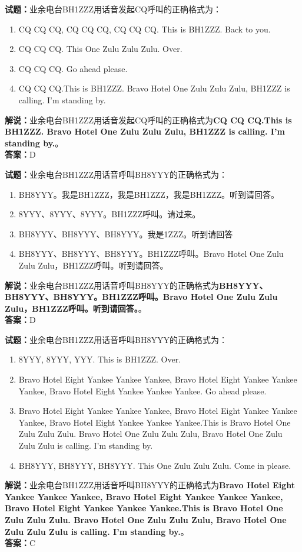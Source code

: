 \documentclass{ctexbook}
\begin{document}
\vspace{1em}

\textbf{试题：}业余电台BH1ZZZ用话音发起CQ呼叫的正确格式为：
\begin{enumerate}[leftmargin=3em]
  \item CQ CQ CQ, CQ CQ CQ, CQ CQ CQ. This is BH1ZZZ. Back to you.
  \item CQ CQ CQ. This One Zulu Zulu Zulu. Over.
  \item CQ CQ CQ. Go ahead please.
  \item CQ CQ CQ.This is BH1ZZZ. Bravo Hotel One Zulu Zulu Zulu, BH1ZZZ is calling. I’m standing by.
\end{enumerate}
\noindent\textbf{解说：}业余电台BH1ZZZ用话音发起CQ呼叫的正确格式为\textbf{CQ CQ CQ.This is BH1ZZZ. Bravo Hotel One Zulu Zulu Zulu, BH1ZZZ is calling. I’m standing by.}。\\\noindent\textbf{答案：}D

\vspace{1em}

\textbf{试题：}业余电台BH1ZZZ用话音呼叫BH8YYY的正确格式为：
\begin{enumerate}[leftmargin=3em]
  \item BH8YYY。我是BH1ZZZ，我是BH1ZZZ，我是BH1ZZZ。听到请回答。
  \item 8YYY、8YYY、8YYY。BH1ZZZ呼叫。请过来。
  \item BH8YYY、BH8YYY、BH8YYY。我是1ZZZ。听到请回答
  \item BH8YYY、BH8YYY、BH8YYY。BH1ZZZ呼叫。Bravo Hotel One Zulu Zulu Zulu，BH1ZZZ呼叫。听到请回答。
\end{enumerate}
\noindent\textbf{解说：}业余电台BH1ZZZ用话音呼叫BH8YYY的正确格式为\textbf{BH8YYY、BH8YYY、BH8YYY。BH1ZZZ呼叫。Bravo Hotel One Zulu Zulu Zulu，BH1ZZZ呼叫。听到请回答。}。\\\noindent\textbf{答案：}D

\vspace{1em}

\textbf{试题：}业余电台BH1ZZZ用话音呼叫BH8YYY的正确格式为：
\begin{enumerate}[leftmargin=3em]
  \item 8YYY, 8YYY, YYY. This is BH1ZZZ. Over.
  \item Bravo Hotel Eight Yankee Yankee Yankee, Bravo Hotel Eight Yankee Yankee Yankee, Bravo Hotel Eight Yankee Yankee Yankee. Go ahead please.
  \item Bravo Hotel Eight Yankee Yankee Yankee, Bravo Hotel Eight Yankee Yankee Yankee, Bravo Hotel Eight Yankee Yankee Yankee.This is Bravo Hotel One Zulu Zulu Zulu. Bravo Hotel One Zulu Zulu Zulu, Bravo Hotel One Zulu Zulu Zulu is calling. I’m standing by.
  \item BH8YYY, BH8YYY, BH8YYY. This One Zulu Zulu Zulu. Come in please.
\end{enumerate}
\noindent\textbf{解说：}业余电台BH1ZZZ用话音呼叫BH8YYY的正确格式为\textbf{Bravo Hotel Eight Yankee Yankee Yankee, Bravo Hotel Eight Yankee Yankee Yankee, Bravo Hotel Eight Yankee Yankee Yankee.This is Bravo Hotel One Zulu Zulu Zulu. Bravo Hotel One Zulu Zulu Zulu, Bravo Hotel One Zulu Zulu Zulu is calling. I’m standing by.}。\\\noindent\textbf{答案：}C
\end{document}
